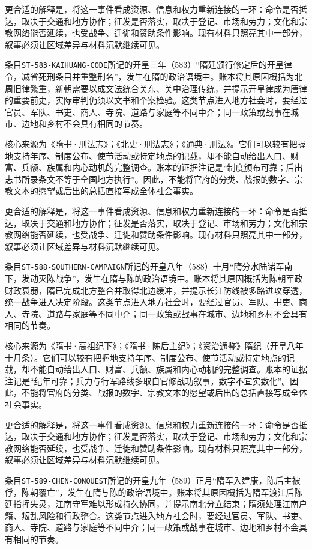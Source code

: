 更合适的解释是，将这一事件看成资源、信息和权力重新连接的一环：命令是否抵达，取决于交通和地方协作；征发是否落实，取决于登记、市场和劳力；文化和宗教网络能否延续，也受战争、迁徙和赞助条件影响。现有材料只照亮其中一部分，叙事必须让区域差异与材料沉默继续可见。

条目\texttt{ST-583-KAIHUANG-CODE}所记的开皇三年（583）“隋廷颁行修定后的开皇律令，减省死刑条目并重整刑名”，发生在隋的政治语境中。账本将其原因概括为北周旧律繁重，新朝需要以成文法统合关东、关中治理传统，并提示开皇律成为唐律的重要前史，实际审判仍须以文书和个案检验。这类节点进入地方社会时，要经过官员、军队、书吏、商人、寺院、道路与家庭等不同中介；同一政策或战事在城市、边地和乡村不会具有相同的节奏。

核心来源为《隋书·刑法志》；《北史·刑法志》；《通典·刑法》。它们可以较有把握地支持年序、制度公布、使节活动或特定地点的记载，却不能自动给出人口、财富、兵额、族属和内心动机的完整调查。账本的证据注记是“制度颁布可靠；后出志书所录条文不等于全国地方执行”。因此，不能将官府的分类、战报的数字、宗教文本的愿望或后出的总括直接写成全体社会事实。

更合适的解释是，将这一事件看成资源、信息和权力重新连接的一环：命令是否抵达，取决于交通和地方协作；征发是否落实，取决于登记、市场和劳力；文化和宗教网络能否延续，也受战争、迁徙和赞助条件影响。现有材料只照亮其中一部分，叙事必须让区域差异与材料沉默继续可见。

条目\texttt{ST-588-SOUTHERN-CAMPAIGN}所记的开皇八年（588）十月“隋分水陆诸军南下，发动灭陈战争”，发生在隋与陈的政治语境中。账本将其原因概括为陈朝军政财政衰弱，隋已完成北方整合并取得北边缓冲，并提示长江防线被多路进攻穿透，统一战争进入决定阶段。这类节点进入地方社会时，要经过官员、军队、书吏、商人、寺院、道路与家庭等不同中介；同一政策或战事在城市、边地和乡村不会具有相同的节奏。

核心来源为《隋书·高祖纪下》；《隋书·陈后主纪》；《资治通鉴》隋纪（开皇八年十月条）。它们可以较有把握地支持年序、制度公布、使节活动或特定地点的记载，却不能自动给出人口、财富、兵额、族属和内心动机的完整调查。账本的证据注记是“纪年可靠；兵力与行军路线多取自官修战功叙事，数字不宜实数化”。因此，不能将官府的分类、战报的数字、宗教文本的愿望或后出的总括直接写成全体社会事实。

更合适的解释是，将这一事件看成资源、信息和权力重新连接的一环：命令是否抵达，取决于交通和地方协作；征发是否落实，取决于登记、市场和劳力；文化和宗教网络能否延续，也受战争、迁徙和赞助条件影响。现有材料只照亮其中一部分，叙事必须让区域差异与材料沉默继续可见。

条目\texttt{ST-589-CHEN-CONQUEST}所记的开皇九年（589）正月“隋军入建康，陈后主被俘，陈朝覆亡”，发生在隋与陈的政治语境中。账本将其原因概括为隋军渡江后陈廷指挥失灵，江南守军难以形成持久协同，并提示南北分立结束；隋须处理江南户籍、叛乱风险和行政整合。这类节点进入地方社会时，要经过官员、军队、书吏、商人、寺院、道路与家庭等不同中介；同一政策或战事在城市、边地和乡村不会具有相同的节奏。

